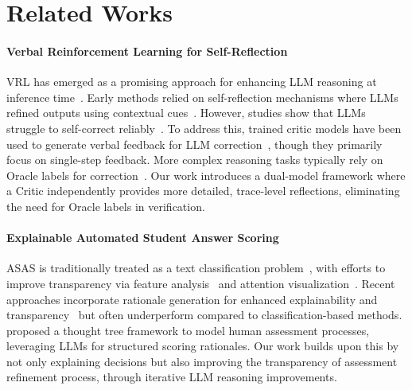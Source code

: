 \section{Related Works}



\paragraph{Verbal Reinforcement Learning for Self-Reflection}
VRL has emerged as a promising approach for enhancing LLM reasoning at inference time~\cite{Huang2023LargeLM, kamoi-etal-2024-llms}. Early methods relied on self-reflection mechanisms where LLMs refined outputs using contextual cues~\cite{chen2024teaching, jiang-etal-2023-active, welleck2023generating}. However, studies show that LLMs struggle to self-correct reliably~\cite{li-etal-2024-hindsight, tyen-etal-2024-llms, chen2024can, kamoi2024evaluating}. To address this, trained critic models have been used to generate verbal feedback for LLM correction~\cite{welleck2023generating, akyurek-etal-2023-rl4f, paul-etal-2024-refiner}, though they primarily focus on single-step feedback. More complex reasoning tasks typically rely on Oracle labels for correction~\cite{shinn2023reflexion, kim2023language}. Our work introduces a dual-model framework where a Critic independently provides more detailed, trace-level reflections, eliminating the need for Oracle labels in verification.

\paragraph{Explainable Automated Student Answer Scoring}
ASAS is traditionally treated as a text classification problem~\cite{grading_classification, taghipour-ng-2016-neural}, with efforts to improve transparency via feature analysis~\cite{dong-zhang-2016-automatic, bert_feature, li-uncertainty-interpretation,zhou-etal-2024-mystery} and attention visualization~\cite{helen-aes-2016, yang-etal-2020-enhancing}. Recent approaches incorporate rationale generation for enhanced explainability and transparency~\cite{li_emnlp2023} but often underperform compared to classification-based methods. \citet{li_emnlp2024, aaai_demo} proposed a thought tree framework to model human assessment processes, leveraging LLMs for structured scoring rationales. Our work builds upon this by not only explaining decisions but also improving the transparency of assessment refinement process, through iterative LLM reasoning improvements.

